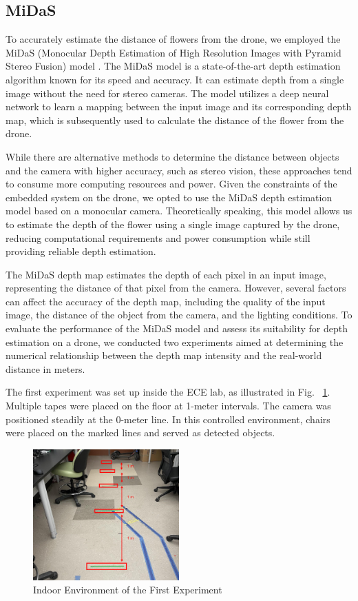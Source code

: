 \subsection{MiDaS}\label{subsection:D}

To accurately estimate the distance of flowers from the drone, we employed the MiDaS (Monocular Depth Estimation of High Resolution Images with Pyramid Stereo Fusion) model \cite{b10}. The MiDaS model is a state-of-the-art depth estimation algorithm known for its speed and accuracy. It can estimate depth from a single image without the need for stereo cameras. The model utilizes a deep neural network to learn a mapping between the input image and its corresponding depth map, which is subsequently used to calculate the distance of the flower from the drone.

While there are alternative methods to determine the distance between objects and the camera with higher accuracy, such as stereo vision, these approaches tend to consume more computing resources and power. Given the constraints of the embedded system on the drone, we opted to use the MiDaS depth estimation model based on a monocular camera. Theoretically speaking, this model allows us to estimate the depth of the flower using a single image captured by the drone, reducing computational requirements and power consumption while still providing reliable depth estimation.

The MiDaS depth map estimates the depth of each pixel in an input image, representing the distance of that pixel from the camera. However, several factors can affect the accuracy of the depth map, including the quality of the input image, the distance of the object from the camera, and the lighting conditions. To evaluate the performance of the MiDaS model and assess its suitability for depth estimation on a drone, we conducted two experiments aimed at determining the numerical relationship between the depth map intensity and the real-world distance in meters.

The first experiment was set up inside the ECE lab, as illustrated in Fig. ~\ref{fig7}. Multiple tapes were placed on the floor at 1-meter intervals. The camera was positioned steadily at the 0-meter line. In this controlled environment, chairs were placed on the marked lines and served as detected objects.

\begin{figure}[H]
    \centerline{\includegraphics[width=0.5\textwidth]{Figures/Methods/env1.png}}
    \caption{Indoor Environment of the First Experiment}
    \label{fig7}
\end{figure}

